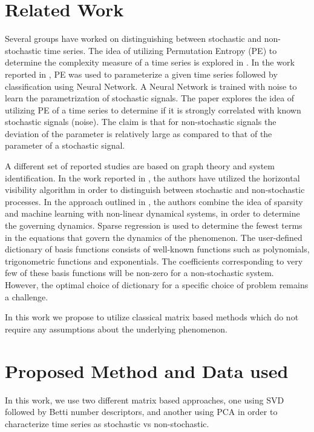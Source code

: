 \documentclass[10pt,conference]{IEEEtran}
\begin{document}
\section{Related Work}
Several groups have worked on distinguishing between stochastic and non-stochastic time series. The idea of utilizing Permutation Entropy (PE) to determine the complexity measure of a time series is explored in \cite{Bandt2002}. In the work reported in \cite{Boaretto2021}, PE was used to parameterize a given time series  followed by classification using  Neural Network. A Neural Network is trained with noise to learn the parametrization of stochastic signals. The paper explores the idea of utilizing PE of a time series to determine if it is strongly correlated with known stochastic signals (noise).   The claim is that for non-stochastic signals the deviation of the parameter is relatively large as compared to that of the parameter of a stochastic signal.

A different set of reported studies are based on  graph theory and system identification. In the work reported in \cite{lacasa2010}, the authors have utilized the horizontal visibility algorithm in order to distinguish between stochastic and non-stochastic processes. In the approach outlined in \cite{Brunton2016}, the authors combine the idea of sparsity and machine learning with non-linear dynamical systems, in order to determine the governing dynamics. Sparse regression is used to determine the fewest terms in the equations that govern the dynamics of the phenomenon. The user-defined dictionary of basis functions consists of well-known functions such as polynomials, trigonometric functions and exponentials. The coefficients corresponding to very few of these basis functions will be non-zero for a non-stochastic system. However, the optimal choice of dictionary for a specific choice of problem remains a challenge.

In this work we propose to utilize classical matrix based methods which do not require any assumptions about the underlying phenomenon.

\section{Proposed Method and Data used}

In this work, we use two different matrix based approaches, one using SVD followed by  Betti number descriptors, and  another using PCA in order to characterize time series as stochastic vs non-stochastic.
\end{document}
